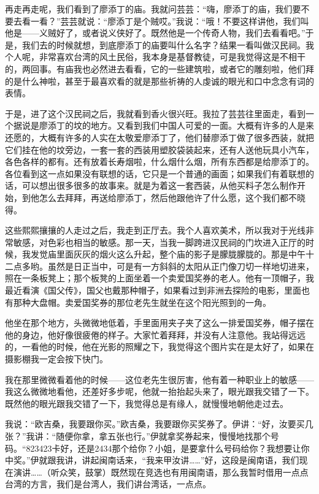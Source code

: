 \par 再走再走呢，我们看到了廖添丁的庙。我就问芸芸：“嗨，廖添丁的庙，我们要不要去看一看？”芸芸就说：“廖添丁是个贼哎。”我说：“哦！不要这样讲他，我们叫他是——义贼好了，或者说义侠好了。既然他是一个传奇人物，我们去看看吧。”于是，我们去的时候就想，到底廖添丁的庙要叫什么名字？结果一看叫做汉民祠。我个人呢，非常喜欢台湾的风土民俗，我本身是基督教徒，可是我觉得这是不相干的，两回事。有庙我也必然进去看看，它的一些建筑啦，或者它的雕刻啦，他们拜的是什么神啦，甚至于最喜欢看的就是那些祈祷的人虔诚的眼光和口中念念有词的表情。
\par 于是，进了这个汉民祠之后，我就看到香火很兴旺。我拉了芸芸往里面走，看到一个据说是廖添丁的坟的地方。又看到我们中国人可爱的一面。大概有许多的人是来还愿的，大概有许多的人实在太敬爱廖添丁了，他们替廖添丁做了很多西装，就把它们挂在他的坟旁边，一套一套的西装用塑胶袋装起来，还有人送他玩具小汽车，各色各样的都有。还有放着长寿烟啦，什么烟什么烟，所有东西都是给廖添丁的。各位看到这一点如果没有联想的话，它只是一个普通的画面；如果我们有着联想的话，可以想出很多很多的故事来。就是为着这一套西装，从他买料子怎么制作开始，到他怎么去拜拜，再送给廖添丁，然后他跟他许了什么愿，这个我们都不晓得。
\par 这些熙熙攘攘的人走过之后，我走到正厅去。我个人喜欢美术，所以我对于光线非常敏感，对色彩也相当的敏感。那一天，当我一脚跨进汉民祠的门坎进入正厅的时候，我发觉庙里面灰灰的烟火这么升起，整个庙的影子是朦胧朦胧的。那是中午十二点多哟。虽然是日正当中，可是有一方斜斜的太阳从正门像刀切一样地切进来，照在一条板凳上；那个板凳的上面坐着一个卖爱国奖券的老人。他有一顶帽子，我最近看演《国父传》，国父也戴那种帽子，如果看过到非洲去探险的电影，里面也有那种大盘帽。卖爱国奖券的那位老先生就坐在这个阳光照到的一角。
\par 他坐在那个地方，头微微地低着，手里面用夹子夹了这么一排爱国奖券，帽子摆在他的身边，他好像很疲倦的样子。大家忙着拜拜，并没有人注意他。我站得远远的，一看他的时候，他在光影的照耀之下，我觉得这个图片实在是太好了，如果在摄影棚我一定会按下快门。
\par 我在那里微微看着他的时候——这位老先生很厉害，他有着一种职业上的敏感——我这么微微地看他，还差好多步呢，他就一抬抬起头来了，眼光跟我交错了一下。既然他的眼光跟我交错了一下，我觉得总是有缘人，就慢慢地朝他走过去。
\par 我说：“欧吉桑，我要跟你买。”欧吉桑，我要跟你买奖券了。伊讲：“好，汝要买几张？”我讲：“随便你拿，拿五张也行。”伊就拿奖券起来，慢慢地找那个号码。“823423卡好，还是2434那个给你？小姐，是要拿什么号码给你？我想要让你中奖。”伊就跟我讲，讲起闽南话来，“我来甲汝讲……”好，这段是闽南语，我们现在演讲……（听众笑，鼓掌）既然现在竞选也有用闽南语，那么我暂时借用一点点台湾的方言，我们是台湾人，我们讲台湾话，一点点。
